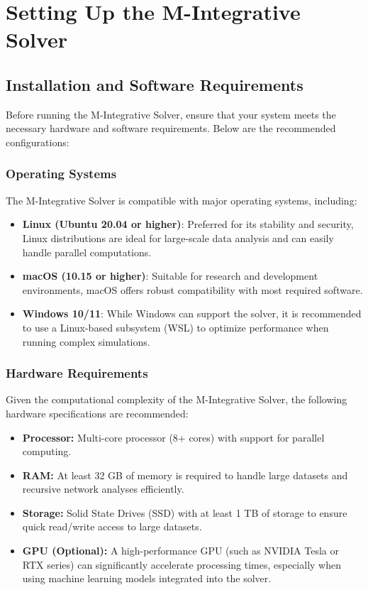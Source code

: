 \documentclass[%
 preprint, linenumbers,
 amsmath,amssymb,
 aps, physrev,
]{revtex4-2}
\begin{document}
\section{Setting Up the M-Integrative Solver}

\subsection{Installation and Software Requirements}

Before running the M-Integrative Solver, ensure that your system meets the necessary hardware and software requirements. Below are the recommended configurations:

\subsubsection{Operating Systems}
The M-Integrative Solver is compatible with major operating systems, including:
\begin{itemize}
    \item \textbf{Linux (Ubuntu 20.04 or higher)}: Preferred for its stability and security, Linux distributions are ideal for large-scale data analysis and can easily handle parallel computations.
    \item \textbf{macOS (10.15 or higher)}: Suitable for research and development environments, macOS offers robust compatibility with most required software.
    \item \textbf{Windows 10/11}: While Windows can support the solver, it is recommended to use a Linux-based subsystem (WSL) to optimize performance when running complex simulations.
\end{itemize}

\subsubsection{Hardware Requirements}
Given the computational complexity of the M-Integrative Solver, the following hardware specifications are recommended:
\begin{itemize}
    \item \textbf{Processor:} Multi-core processor (8+ cores) with support for parallel computing.
    \item \textbf{RAM:} At least 32 GB of memory is required to handle large datasets and recursive network analyses efficiently.
    \item \textbf{Storage:} Solid State Drives (SSD) with at least 1 TB of storage to ensure quick read/write access to large datasets.
    \item \textbf{GPU (Optional):} A high-performance GPU (such as NVIDIA Tesla or RTX series) can significantly accelerate processing times, especially when using machine learning models integrated into the solver.
\end{itemize}
\end{document}
